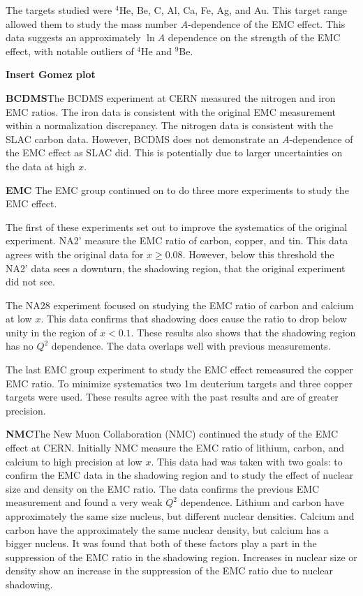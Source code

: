 The targets studied were $^4$He, Be, C, Al, Ca, Fe, Ag, and Au. This target range allowed them to study the mass number $A$-dependence of the EMC effect. This data suggests an approximately $\ln A$ dependence on the strength of the EMC effect, with notable outliers of $^4$He and $^9$Be. \cite{Arnold,Gomez}

\textbf{Insert Gomez plot}


\textbf{BCDMS}The BCDMS experiment at CERN measured the nitrogen and iron EMC ratios. The iron data is consistent with the original EMC measurement within a normalization discrepancy. The nitrogen data is consistent with the SLAC carbon data. However, BCDMS does not demonstrate an $A$-dependence of the EMC effect as SLAC did. This is potentially due to larger uncertainties on the data at high $x$.

\textbf{EMC} The EMC group continued on to do three more experiments to study the EMC effect.

The first of these experiments set out to improve the systematics of the original experiment. NA2' measure the EMC ratio of carbon, copper, and tin. This data agrees with the original data for $x \geq 0.08$. However, below this threshold the NA2' data sees a downturn, the shadowing region, that the original experiment did not see. 

The NA28 experiment focused on studying the EMC ratio of carbon and calcium at low $x$. This data confirms that shadowing does cause the ratio to drop below unity in the region of $x<0.1$. These results also shows that the shadowing region has no $Q^2$ dependence. The data overlaps well with previous measurements.

The last EMC group experiment to study the EMC effect remeasured the copper EMC ratio. To minimize systematics two 1m deuterium targets and three copper targets were used. These results agree with the past results and are of greater precision. %

\textbf{NMC}The New Muon Collaboration (NMC) continued the study of the EMC effect at CERN. Initially NMC measure the EMC ratio of lithium, carbon, and calcium to high precision at low $x$. This data had was taken with two goals: to confirm the EMC data in the shadowing region and to study the effect of nuclear size and density on the EMC ratio. The data confirms the previous EMC measurement and found a very weak $Q^2$ dependence. Lithium and carbon have approximately the same size nucleus, but different nuclear densities. Calcium and carbon have the approximately the same nuclear density, but calcium has a bigger nucleus. It was found that both of these factors play a part in the suppression of the EMC ratio in the shadowing region. Increases in nuclear size or density show an increase in the suppression of the EMC ratio due to nuclear shadowing.

